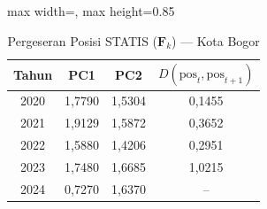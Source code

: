 \begin{table}[H]
\centering
\caption{Pergeseran Posisi STATIS ($\mathbf{F}_k$) --- Kota Bogor} \label{tab:app2jarak_statis_skor_kota_bogor}
\begin{adjustbox}{max width=\textwidth, max height=0.85\textheight}
\begin{tabular}{|c|c|c|c|}
\hline
\textbf{Tahun} & \textbf{PC1} & \textbf{PC2} & \textbf{$D(\text{pos}_t, \text{pos}_{t+1})$} \\
\hline
2020 & 1,7790 & 1,5304 & 0,1455 \\
2021 & 1,9129 & 1,5872 & 0,3652 \\
2022 & 1,5880 & 1,4206 & 0,2951 \\
2023 & 1,7480 & 1,6685 & 1,0215 \\
2024 & 0,7270 & 1,6370 & -- \\
\hline
\end{tabular}
\end{adjustbox}
\end{table}